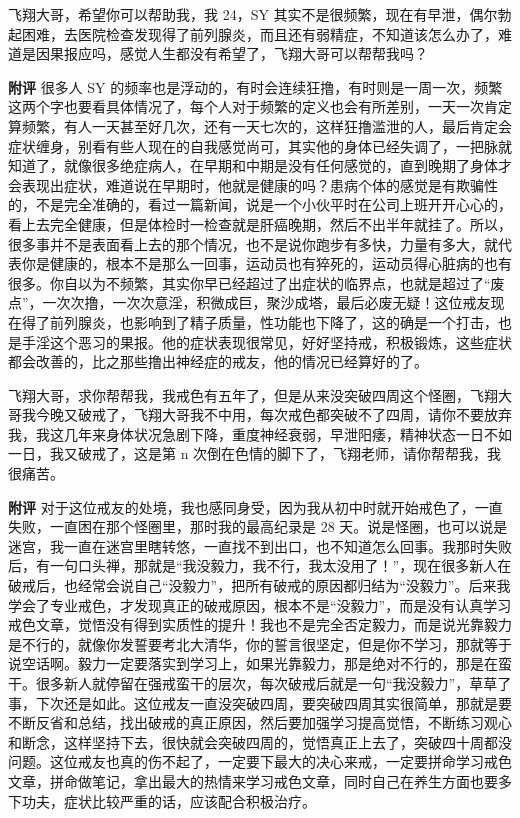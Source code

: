 \begin{case}
    飞翔大哥，希望你可以帮助我，我 24，SY 其实不是很频繁，现在有早泄，偶尔勃起困难，去医院检查发现得了前列腺炎，而且还有弱精症，不知道该怎么办了，难道是因果报应吗，感觉人生都没有希望了，飞翔大哥可以帮帮我吗？

    \textbf{附评} 很多人 SY 的频率也是浮动的，有时会连续狂撸，有时则是一周一次，频繁这两个字也要看具体情况了，每个人对于频繁的定义也会有所差别，一天一次肯定算频繁，有人一天甚至好几次，还有一天七次的，这样狂撸滥泄的人，最后肯定会症状缠身，别看有些人现在的自我感觉尚可，其实他的身体已经失调了，一把脉就知道了，就像很多绝症病人，在早期和中期是没有任何感觉的，直到晚期了身体才会表现出症状，难道说在早期时，他就是健康的吗？患病个体的感觉是有欺骗性的，不是完全准确的，看过一篇新闻，说是一个小伙平时在公司上班开开心心的，看上去完全健康，但是体检时一检查就是肝癌晚期，然后不出半年就挂了。所以，很多事并不是表面看上去的那个情况，也不是说你跑步有多快，力量有多大，就代表你是健康的，根本不是那么一回事，运动员也有猝死的，运动员得心脏病的也有很多。你自以为不频繁，其实你早已经超过了出症状的临界点，也就是超过了“废点”，一次次撸，一次次意淫，积微成巨，聚沙成塔，最后必废无疑！这位戒友现在得了前列腺炎，也影响到了精子质量，性功能也下降了，这的确是一个打击，也是手淫这个恶习的果报。他的症状表现很常见，好好坚持戒，积极锻炼，这些症状都会改善的，比之那些撸出神经症的戒友，他的情况已经算好的了。
\end{case}

\begin{case}
    飞翔大哥，求你帮帮我，我戒色有五年了，但是从来没突破四周这个怪圈，飞翔大哥我今晚又破戒了，飞翔大哥我不中用，每次戒色都突破不了四周，请你不要放弃我，我这几年来身体状况急剧下降，重度神经衰弱，早泄阳痿，精神状态一日不如一日，我又破戒了，这是第 n 次倒在色情的脚下了，飞翔老师，请你帮帮我，我很痛苦。

    \textbf{附评} 对于这位戒友的处境，我也感同身受，因为我从初中时就开始戒色了，一直失败，一直困在那个怪圈里，那时我的最高纪录是 28 天。说是怪圈，也可以说是迷宫，我一直在迷宫里瞎转悠，一直找不到出口，也不知道怎么回事。我那时失败后，有一句口头禅，那就是“我没毅力，我不行，我太没用了！”，现在很多新人在破戒后，也经常会说自己“没毅力”，把所有破戒的原因都归结为“没毅力”。后来我学会了专业戒色，才发现真正的破戒原因，根本不是“没毅力”，而是没有认真学习戒色文章，觉悟没有得到实质性的提升！我也不是完全否定毅力，而是说光靠毅力是不行的，就像你发誓要考北大清华，你的誓言很坚定，但是你不学习，那就等于说空话啊。毅力一定要落实到学习上，如果光靠毅力，那是绝对不行的，那是在蛮干。很多新人就停留在强戒蛮干的层次，每次破戒后就是一句“我没毅力”，草草了事，下次还是如此。这位戒友一直没突破四周，要突破四周其实很简单，那就是要不断反省和总结，找出破戒的真正原因，然后要加强学习提高觉悟，不断练习观心和断念，这样坚持下去，很快就会突破四周的，觉悟真正上去了，突破四十周都没问题。这位戒友也真的伤不起了，一定要下最大的决心来戒，一定要拼命学习戒色文章，拼命做笔记，拿出最大的热情来学习戒色文章，同时自己在养生方面也要多下功夫，症状比较严重的话，应该配合积极治疗。
\end{case}

